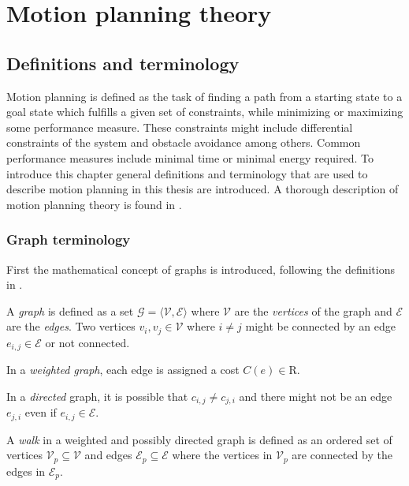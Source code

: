 \chapter{Motion planning theory}\label{cha:motion_planning}
\section{Definitions and terminology}
Motion planning is defined as the task of finding a
path from a starting state to a goal state which fulfills a given set of constraints, while minimizing or maximizing some 
performance measure.
These constraints might include differential constraints of the system and obstacle avoidance among others.
Common performance measures include minimal time or minimal energy required.
To introduce this chapter general definitions and terminology that are used to
describe motion planning in this thesis are introduced. A thorough description of motion planning theory is found in 
\cite{planning_algorithms}.
\subsection{Graph terminology}
First the mathematical concept of graphs is introduced, following the definitions in \cite{graph_theory}.

\begin{definition}[Graph]
    A \textit{graph} is defined as a set $\mathcal{G}=\langle\mathcal{V},\mathcal{E}\rangle$ 
    where $\mathcal{V}$ are the \textit{vertices} of the graph and $\mathcal{E}$ are the \textit{edges}.
    Two vertices $v_i,v_j\in\mathcal{V}$ where $i\neq j$ might be connected by an edge $e_{i,j}\in\mathcal{E}$ or not connected.
\end{definition}
    
\begin{definition}
    In a \textit{weighted graph}, each edge is assigned a cost $C(e)\in\mathrm{R}$. 
\end{definition}


\begin{definition}
    In a \textit{directed} graph, it is possible that $c_{i,j}\neq c_{j,i}$ and
    there might not be an edge $e_{j,i}$ even if $e_{i,j}\in\mathcal{E}$.
\end{definition}

\begin{definition}[Walk]
    A \textit{walk} in a weighted and possibly directed graph is defined as an ordered set of vertices
    $\mathcal{V}_p\subseteq\mathcal{V}$ and edges $\mathcal{E}_p\subseteq\mathcal{E}$ where the vertices in 
    $\mathcal{V}_p$ are connected by the edges in $\mathcal{E}_p$.
\end{definition}

